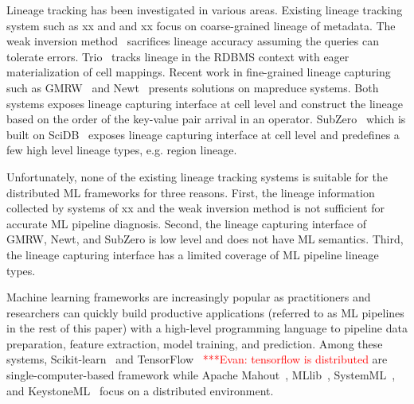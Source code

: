 \documentclass{sig-alternate}
\newcommand{\evannote}[1]{{\textcolor{red}    { ***Evan:      #1 }}}
\newcommand{\evannote}[1]{}
\begin{document}
Lineage tracking has been investigated in various areas.
Existing lineage tracking system such as xx and and xx focus on coarse-grained lineage of metadata.
The weak inversion method~\cite{woodruff97} sacrifices lineage accuracy assuming the queries can tolerate errors.
Trio~\cite{widom04} tracks lineage in the RDBMS context with eager materialization of cell mappings.
Recent work in fine-grained lineage capturing such as GMRW~\cite{ikeda11} and Newt~\cite{logothetis13} presents
solutions on mapreduce systems. Both systems exposes lineage capturing interface at cell level and construct the 
lineage based on the order of the key-value pair arrival in an operator. 
SubZero~\cite{wu13} which is built on SciDB~\cite{brown10} exposes lineage capturing interface at cell level and
predefines a few high level lineage types, e.g. region lineage.

Unfortunately, none of the existing lineage tracking systems is suitable for the distributed ML frameworks
for three reasons.
First, the lineage information collected by systems of xx and the weak inversion method is not sufficient for accurate ML pipeline diagnosis.
Second, the lineage capturing interface of GMRW, Newt, and SubZero is low level and does not have ML semantics.
Third, the lineage capturing interface has a limited coverage of ML pipeline lineage types.



Machine learning frameworks are increasingly popular as practitioners and researchers can quickly
build productive applications (referred to as ML pipelines in the rest of this paper) with a high-level 
programming language to pipeline data preparation, feature extraction, model training, 
and prediction. 
Among these systems, Scikit-learn~\cite{pedregosa2011scikit} and TensorFlow~\cite{tensorflow15} \evannote{tensorflow is distributed}
are single-computer-based framework while Apache Mahout~\cite{owen2011mahout}, MLlib~\cite{meng2015mllib}, 
SystemML~\cite{ghoting11systemml}, and KeystoneML~\cite{sparks15} focus on a distributed environment.
\end{document}
